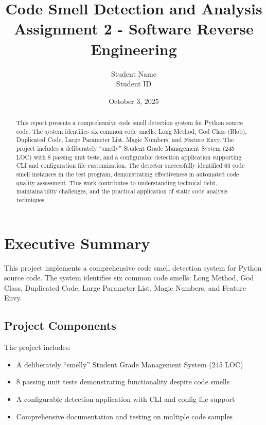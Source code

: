 \documentclass[11pt,a4paper]{article}
\title{\textbf{Code Smell Detection and Analysis} \\ \large{Assignment 2 - Software Reverse Engineering}}
\author{Student Name \\ Student ID}
\date{October 3, 2025}
\begin{document}
\maketitle

\begin{abstract}
This report presents a comprehensive code smell detection system for Python source code. The system identifies six common code smells: Long Method, God Class (Blob), Duplicated Code, Large Parameter List, Magic Numbers, and Feature Envy. The project includes a deliberately ``smelly'' Student Grade Management System (245 LOC) with 8 passing unit tests, and a configurable detection application supporting CLI and configuration file customization. The detector successfully identified 63 code smell instances in the test program, demonstrating effectiveness in automated code quality assessment. This work contributes to understanding technical debt, maintainability challenges, and the practical application of static code analysis techniques.
\end{abstract}

\tableofcontents
\newpage

\section{Executive Summary}

This project implements a comprehensive code smell detection system for Python source code. The system identifies six common code smells: Long Method, God Class, Duplicated Code, Large Parameter List, Magic Numbers, and Feature Envy. 

\subsection{Project Components}

The project includes:

\begin{itemize}[noitemsep]
    \item A deliberately ``smelly'' Student Grade Management System (245 LOC)
    \item 8 passing unit tests demonstrating functionality despite code smells
    \item A configurable detection application with CLI and config file support
    \item Comprehensive documentation and testing on multiple code samples
\end{itemize}
\end{document}
